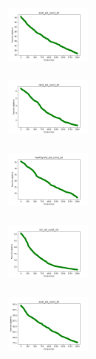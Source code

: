 \begin{figure}[H]
\begin{subfigure}
    \end{subfigure}
    \hfill
    \begin{subfigure}
        \centering
        \includegraphics[width=0.234\textwidth]{img/ageun/ecoli_set_const_20_589741062_cost.png}
    \end{subfigure}
    \hfill
    \begin{subfigure}
        \centering
        \includegraphics[width=0.234\textwidth]{img/ageun/rand_set_const_20_589741062_cost.png}
    \end{subfigure}
    \hfill
    \begin{subfigure}
        \centering
        \includegraphics[width=0.234\textwidth]{img/ageun/newthyroid_set_const_20_589741062_cost.png}
    \end{subfigure}
    \hfill
    \begin{subfigure}
        \centering
        \includegraphics[width=0.234\textwidth]{img/ageun/iris_set_const_20_277451237_cost.png}
    \end{subfigure}
    \hfill
    \begin{subfigure}
        \centering
        \includegraphics[width=0.234\textwidth]{img/ageun/ecoli_set_const_20_277451237_cost.png}
    \end{subfigure}
    \hfill

\end{figure}
